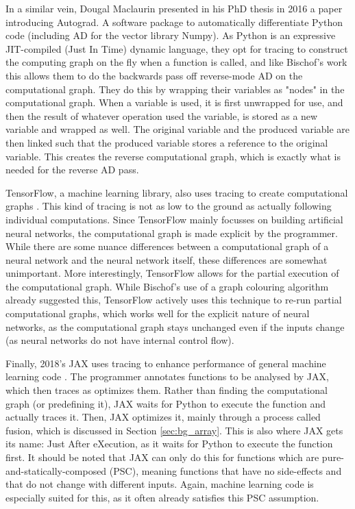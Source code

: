         In a similar vein, Dougal Maclaurin presented in his PhD thesis in 2016 \cite{maclaurin2016modeling} a paper introducing Autograd.
        A software package to automatically differentiate Python code (including AD for the vector library Numpy).
        As Python is an expressive JIT-compiled (Just In Time) dynamic language, they opt for tracing to construct the computing graph on the fly when a function is called, and like Bischof's work this allows them to do the backwards pass off reverse-mode AD on the computational graph.
        They do this by wrapping their variables as "nodes" in the computational graph.
        When a variable is used, it is first unwrapped for use, and then the result of whatever operation used the variable, is stored as a new variable and wrapped as well.
        The original variable and the produced variable are then linked such that the produced variable stores a reference to the original variable.
        This creates the reverse computational graph, which is exactly what is needed for the reverse AD pass.

        TensorFlow, a machine learning library, also uses tracing to create computational graphs \cite{abadi2016tensorflow}.
        This kind of tracing is not as low to the ground as actually following individual computations.
        Since TensorFlow mainly focusses on building artificial neural networks, the computational graph is made explicit by the programmer.
        While there are some nuance differences between a computational graph of a neural network and the neural network itself, these differences are somewhat unimportant.
        More interestingly, TensorFlow allows for the partial execution of the computational graph.
        While Bischof's use of a graph colouring algorithm already suggested this, TensorFlow actively uses this technique to re-run partial computational graphs, which works well for the explicit nature of neural networks, as the computational graph stays unchanged even if the inputs change (as neural networks do not have internal control flow).

        Finally, 2018's JAX uses tracing to enhance performance of general machine learning code \cite{frostig2018compiling}.
        The programmer annotates functions to be analysed by JAX, which then traces as optimizes them.
        Rather than finding the computational graph (or predefining it), JAX waits for Python to execute the function and actually traces it.
        Then, JAX optimizes it, mainly through a process called fusion, which is discussed in Section \ref{sec:bg_array}.
        This is also where JAX gets its name: Just After eXecution, as it waits for Python to execute the function first.
        It should be noted that JAX can only do this for functions which are pure-and-statically-composed (PSC), meaning functions that have no side-effects and that do not change with different inputs.
        Again, machine learning code is especially suited for this, as it often already satisfies this PSC assumption.
        
